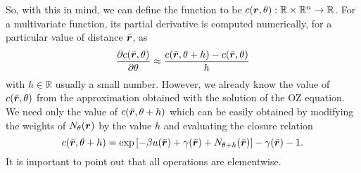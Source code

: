 So, with this in mind, we can define the function to be 
$c(\bm{r}, \theta) : \mathbb{R} \times \mathbb{R}^{n} \to \mathbb{R}$.
For a multivariate function, its partial derivative is computed numerically,
for a particular value of distance $\bar{\bm{r}}$, as
\begin{equation}
    \frac{\partial c(\bar{\bm{r}}, \theta)}{\partial \theta} \approx
    \frac{c(\bar{\bm{r}}, \theta + h) - c(\bar{\bm{r}}, \theta)}{h}
    \label{eq:num-diff}
\end{equation}
with $h \in \mathbb{R}$ usually a small number. However, we already know the value
of $c(\bar{\bm{r}}, \theta)$ from the approximation obtained with the solution of
the OZ equation. We need only the value of $c(\bar{\bm{r}}, \theta + h)$ which can
be easily obtained by modifying the weights of $N_{\theta}(\bm{r})$ by the value $h$ and evaluating
the closure relation
\[
    c(\bar{\bm{r}}, \theta + h) = \exp{\left[-\beta u(\bar{\bm{r}}) + \gamma(\bar{\bm{r}}) + N_{\theta + h}(\bar{\bm{r}})\right] - \gamma(\bar{\bm{r}}) - 1} .
\]
It is important to point out that all operations are elementwise.

